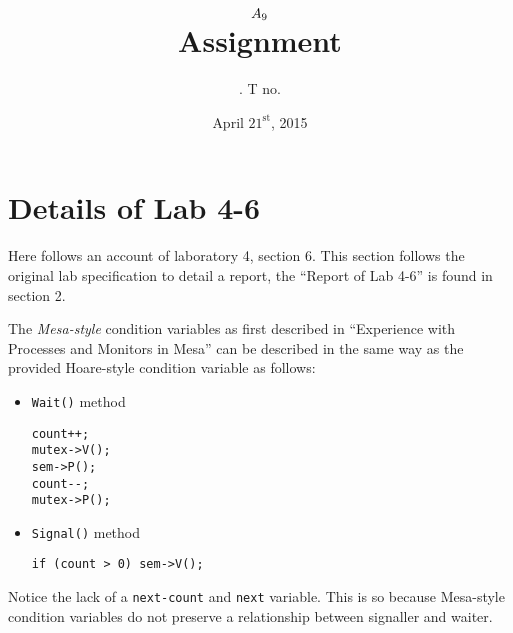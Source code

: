 \documentclass[11pt]{article}
\title{
    $A_{9}$ \\
    {\large Assignment \rom{\hw}}
}
\author{
    \name. T no. \tno
}
\date{April $21^{\text{st}}$, 2015}
\begin{document}
\maketitle

\section{Details of Lab 4-6}

Here follows an account of laboratory 4, section 6. This section follows the original lab specification to detail a report, the ``Report of Lab 4-6'' is found in section 2.

\begin{question}

    The {\it Mesa-style} condition variables as first described in ``Experience with Processes and Monitors in Mesa'' can be described in the same way as the provided Hoare-style condition variable as follows:

    \begin{itemize}
        \item{
            {\tt Wait()} method
            \begin{verbatim}
count++;
mutex->V();
sem->P();
count--;
mutex->P();
            \end{verbatim}
        }
        \item{
            {\tt Signal()} method
            \begin{verbatim}
if (count > 0) sem->V();
            \end{verbatim}
        }
    \end{itemize}

    Notice the lack of a {\tt next-count} and {\tt next} variable. This is so because Mesa-style condition variables do not preserve a relationship between signaller and waiter.

\end{question}
\end{document}
